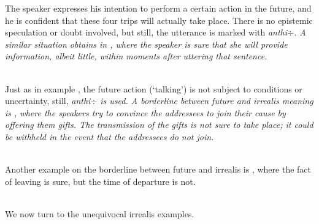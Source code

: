 The speaker expresses his intention to perform a certain action in the future, and he is  confident that these four trips will actually take place. There is no epistemic speculation or doubt involved, but still, the utterance is marked with \em anthi$\div$\em. A similar situation obtains in , where the speaker is sure that she will provide information, albeit little, within moments after uttering that sentence.


 \\


Just as in   example , the future action (`talking') is not subject to conditions or uncertainty, still, \em anthi$\div$ \em is used. A borderline between future and irrealis  meaning is , where the speakers try to convince the addressees to join their cause by offering them gifts. The transmission of the gifts is not sure to take place; it could be withheld in the event that the addressees do not join.



\\ 

Another example on the borderline between future and irrealis is , where the fact of leaving is sure, but the time of departure is not. 
 
 \\
We now turn to the unequivocal irrealis examples.
% 
%  

